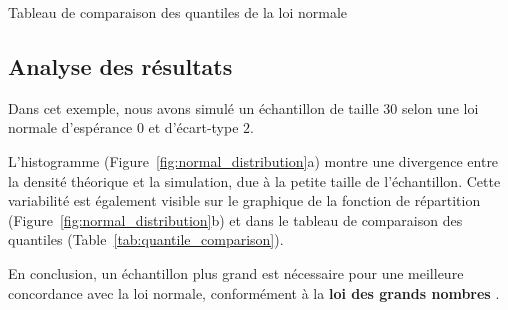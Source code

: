     \begin{table}[H]
        \centering
        \caption{Tableau de comparaison des quantiles de la loi normale}
        \label{tab:quantile_comparison}
    \end{table}

    \subsection{Analyse des résultats}
        Dans cet exemple, nous avons simulé un échantillon de taille 30 selon une loi normale d'espérance $0$ et d'écart-type $2$.

        L'histogramme (Figure~\ref{fig:normal_distribution}a) montre une divergence entre la densité théorique et la simulation, due à la petite taille de l'échantillon. Cette variabilité est également visible sur le graphique de la fonction de répartition (Figure~\ref{fig:normal_distribution}b) et dans le tableau de comparaison des quantiles (Table~\ref{tab:quantile_comparison}).

        En conclusion, un échantillon plus grand est nécessaire pour une meilleure concordance avec la loi normale, conformément à la \textbf{loi des grands nombres} \cite{lawoflargeNumbers}.
\smallskip